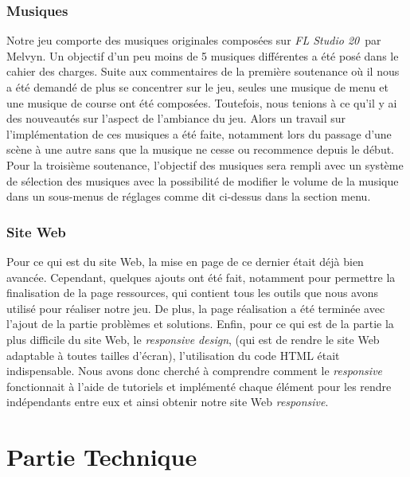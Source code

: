 \documentclass[a4paper,12pt]{article}
\newcommand{\FL}{\textsl{FL Studio 20}}
\begin{document}
            \subsubsection{Musiques}
                Notre jeu comporte des musiques originales composées sur \FL\, par Melvyn. Un objectif d'un 
                peu moins de 5 musiques différentes a été posé dans le cahier des charges. Suite aux 
                commentaires de la première soutenance où il nous a été demandé de plus se concentrer sur le
                jeu, seules une musique de menu et une musique de course ont été composées. Toutefois, nous 
                tenions à ce qu'il y ai des nouveautés sur l'aspect de l'ambiance du jeu. Alors un travail 
                sur l'implémentation de ces musiques a été faite, notamment lors du passage d'une scène à
                une autre sans que la musique ne cesse ou recommence depuis le début. Pour la troisième 
                soutenance, l'objectif des musiques sera rempli avec un système de sélection des musiques 
                avec la possibilité de modifier le volume de la musique dans un sous-menus de réglages comme
                dit ci-dessus dans la section menu.
            
            \subsubsection{Site Web}
                Pour ce qui est du site Web, la mise en page de ce dernier était déjà bien avancée. 
                Cependant, quelques ajouts ont été fait, notamment pour permettre la finalisation de la 
                page ressources, qui contient tous les outils que nous avons utilisé pour réaliser notre 
                jeu. De plus, la page réalisation a été terminée avec l'ajout de la partie 
                problèmes et solutions.
                Enfin, pour ce qui est de la partie la plus difficile du site Web, le \textit{responsive 
                design}, (qui est de rendre le site Web adaptable à toutes tailles d'écran), l'utilisation 
                du code HTML était indispensable. Nous avons donc cherché à comprendre comment le 
                \textit{responsive} fonctionnait à l'aide de tutoriels et implémenté chaque élément 
                pour les rendre indépendants entre eux et ainsi obtenir notre site Web \textit{responsive}.


    \section{Partie Technique}
    \lipsum[28-32]
\end{document}
